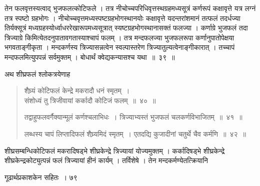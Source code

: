 \documentclass[11pt, openany]{book}
\begin{document}
\begin{sloppypar}
\noindent तेन फलवृत्तस्यत्वाद् भुजफलत्कोटिफले । तत्र नीचोच्चपरिधिवृत्तस्थग्रहमध्यसूत्रं कर्णरूपं कक्षावृत्ते यत्र लग्नं तत्र स्पष्टो ग्रहभोगः । नीचोच्चवृत्तमध्यस्पष्टग्रहभोगस्थानयोः कक्षावृत्ते यदन्तरांशमानं तत्फलं तदर्धज्या तिर्यक्सूत्रं मध्यग्रहस्योर्ध्वाधररेखारूपमध्यसूत्रात् स्यष्टग्रहभोगस्थानासक्तं फलज्या । कर्णाग्रे भुजफलं तदा त्रिज्याग्रे किमित्येतदनुपातावगतास्याश्चापं फलम् । तत्र मन्दफलज्या भुजफलरूपा कर्णानुपातोपेक्षया भगवताङ्गीकृता । मन्दकर्णस्य त्रिज्यासन्नत्वेन स्वल्पास्तरेण त्रिज्यातुल्यत्वेनाङ्गीकारात् । तच्चापं मन्दफलमित्युपपन्नं सर्वमुक्तम् । बोधार्थं क्वेद्यकन्यासश्च यथा~॥~३९~॥

\end{sloppypar}
\vspace{3mm}
{\setlength{\parindent}{8em}
अथ शीघ्रफलं श्लोकत्रयेणाह\textendash}
\begin{quote}

{\ssi शैघ्र्यं कोटिफलं केन्द्रे मकरादौ धनं स्मृतम्~।\\
संशोध्यं तु त्रिजीवायां कर्कादौ कोटिजं फलम्~॥~४०~॥

तद्वाहुफलवर्गैक्यान्मूलं कर्णश्चलाभिधः~।
त्रिज्याभ्यस्तं भुजफलं चलकर्णविभाजितम्~॥~४१~॥

लब्धस्य चापं लिप्तादिफलं शैघ्र्यमिदं स्मृतम्~।
एतदद्यि कुजादीनां चतुर्थे चैव कर्मणि~॥~४२~॥}
\end{quote}
\begin{sloppypar}
शीघ्रसम्बन्धिकोटिफलं मकरादिषड्भे शीघ्रकेन्द्रे त्रिज्यायां योज्यमुक्तम् । कर्कादिषड्भे शीघ्रकेन्द्रे शीघ्रकेन्द्रकोट्युत्पन्नं फलं त्रिज्यायां हीनं कार्यम् । तर्विशेषे । तेन मन्दकर्मण्येतत्क्रियानि\textendash
\end{sloppypar}


\newpage

\hspace{3cm}गूढार्थप्रकाशकेन सहितः~। \hfill ७९
\vspace{1cm}
\end{document}
